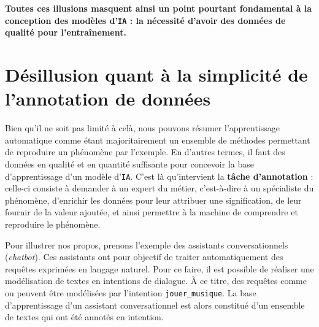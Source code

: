 		\textbf{Toutes ces illusions masquent ainsi un point pourtant fondamental à la conception des modèles d'\texttt{IA} : la nécessité d'avoir des données de qualité pour l'entraînement.}
		
		
	\section*{Désillusion quant à la simplicité de l'annotation de données}
		
		Bien qu'il ne soit pas limité à celà, nous pouvons résumer l'apprentissage automatique comme étant majoritairement un ensemble de méthodes permettant de reproduire un phénomène par l'exemple.
		En d'autres termes, il faut des données en qualité et en quantité suffisante pour concevoir la base d'apprentissage d'un modèle d'\texttt{IA}.
		C'est là qu'intervient la \textbf{tâche d'annotation} : celle-ci consiste à demander à un expert du métier, c'est-à-dire à un spécialiste du phénomène, d'enrichir les données pour leur attribuer une signification, de leur fournir de la valeur ajoutée, et ainsi permettre à la machine de comprendre et reproduire le phénomène.
		\newline
		
		Pour illustrer nos propos, prenons l'exemple des assistants conversationnels (\textit{chatbot}).
		Ces assistants ont pour objectif de traiter automatiquement des requêtes exprimées en langage naturel.
		Pour ce faire, il est possible de réaliser une modélisation de textes en intentions de dialogue.
		À ce titre, des requêtes comme  ou  peuvent être modélisées par l'intention \texttt{jouer\_musique}.
		La base d'apprentissage d'un assistant conversationnel est alors constitué d'un ensemble de textes qui ont été annotés en intention.
		
